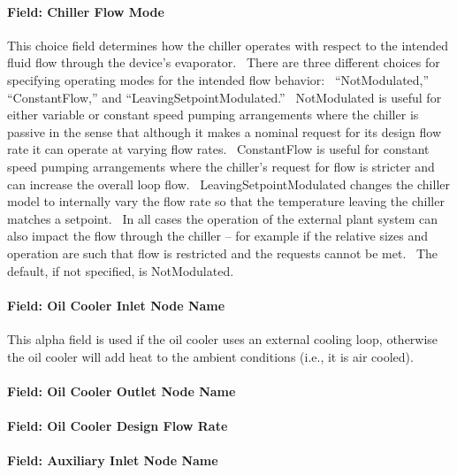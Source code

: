 \paragraph{Field: Chiller Flow Mode}\label{field-chiller205-chiller-flow-mode}

This choice field determines how the chiller operates with respect to the intended fluid flow through the device's evaporator.~ There are three different choices for specifying operating modes for the intended flow behavior:~ ``NotModulated,'' ``ConstantFlow,'' and ``LeavingSetpointModulated.''~ NotModulated is useful for either variable or constant speed pumping arrangements where the chiller is passive in the sense that although it makes a nominal request for its design flow rate it can operate at varying flow rates.~ ConstantFlow is useful for constant speed pumping arrangements where the chiller's request for flow is stricter and can increase the overall loop flow.~ LeavingSetpointModulated changes the chiller model to internally vary the flow rate so that the temperature leaving the chiller matches a setpoint.~ In all cases the operation of the external plant system can also impact the flow through the chiller -- for example if the relative sizes and operation are such that flow is restricted and the requests cannot be met.~ The default, if not specified, is NotModulated.

\paragraph{Field: Oil Cooler Inlet Node Name}\label{field-chiller205-oil-cooler-inlet-node-name}

This alpha field is used if the oil cooler uses an external cooling loop, otherwise the oil cooler will add heat to the ambient conditions (i.e., it is air cooled).

\paragraph{Field: Oil Cooler Outlet Node Name}\label{field-chiller205-oil-cooler-outlet-node-name}

\paragraph{Field: Oil Cooler Design Flow Rate}\label{field-chiller205-oil-cooler-design-flow-rate}

\paragraph{Field: Auxiliary Inlet Node Name}\label{field-chiller205-auxiliary-inlet-node-name}

